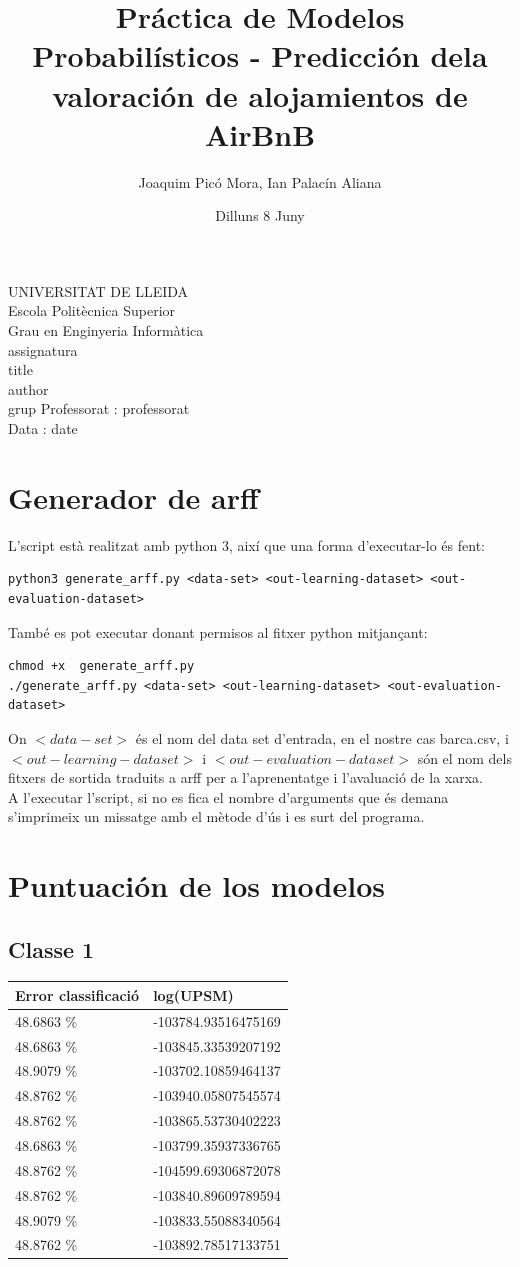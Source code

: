 \documentclass{article}
\title{Práctica de Modelos Probabilísticos - Predicción dela valoración de alojamientos de AirBnB}
\author{Joaquim Picó Mora, Ian Palacín Aliana}
\date{Dilluns 8 Juny}
\renewcommand{\maketitle}{ %
	\begin{titlepage}
		\raggedright{UNIVERSITAT DE LLEIDA \\
			Escola Politècnica Superior \\
			Grau en Enginyeria Informàtica\\
			\1assignatura\\}
		\vspace{5cm}
		\centering\huge{\5title \\}
		\vspace{3cm}
		\large{\6author} \\
		\normalsize{\3grup}
		\vfill
		Professorat : \4professorat \\
		Data : \7date
\end{titlepage}}
\begin{document}
	\maketitle
	\thispagestyle{empty}


\section{Generador de arff}	
L'script està realitzat amb python 3, així que una forma d'executar-lo és fent:
\begin{verbatim}
python3 generate_arff.py <data-set> <out-learning-dataset> <out-evaluation-dataset>
\end{verbatim}
També es pot executar donant permisos al fitxer python mitjançant:
\begin{verbatim}
chmod +x  generate_arff.py
./generate_arff.py <data-set> <out-learning-dataset> <out-evaluation-dataset>
\end{verbatim}
On $<data-set>$ és el nom del data set d'entrada, en el nostre cas barca.csv, i $<out-learning-dataset>$ i $<out-evaluation-dataset>$ són el nom dels fitxers de sortida traduits a arff per a l'aprenentatge i l'avaluació de la xarxa.\\
A l'executar l'script, si no es fica el nombre d'arguments que és demana s'imprimeix un missatge amb el mètode d'ús i es surt del programa. 
\section{Puntuación de los modelos}
\subsection{Classe 1}
\begin{table}[H]
\begin{tabular}{ll}
\hline
Error classificació & log(UPSM)           \\
\hline
48.6863 \%          & -103784.93516475169 \\
48.6863 \%          & -103845.33539207192 \\
48.9079 \%          & -103702.10859464137 \\
48.8762 \%          & -103940.05807545574 \\
48.8762 \%          & -103865.53730402223 \\
48.6863 \%          & -103799.35937336765 \\
48.8762 \%          & -104599.69306872078 \\
48.8762 \%          & -103840.89609789594 \\
48.9079 \%          & -103833.55088340564 \\
48.8762 \%          & -103892.78517133751
\end{tabular}
\end{table}
\end{document}
